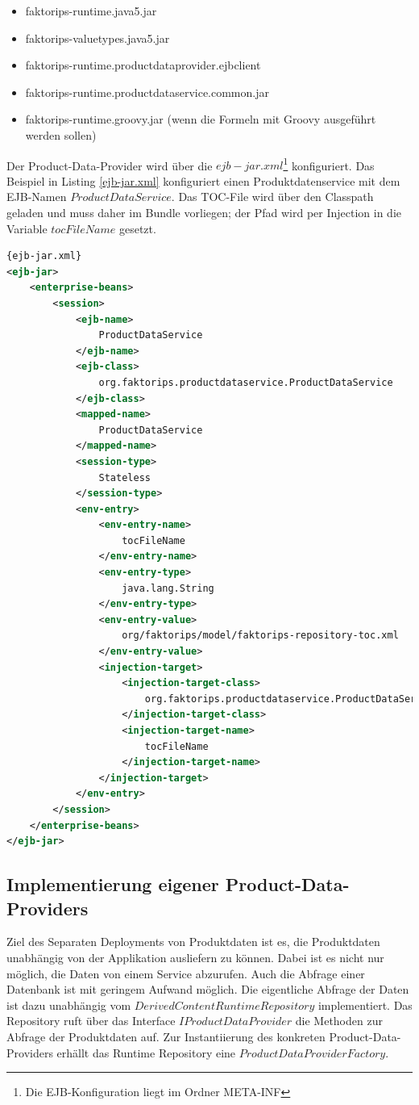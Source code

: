 \documentclass[headsepline=true, footsepline=true]{scrartcl}
\begin{document}
\begin{itemize}
	\item faktorips-runtime.java5.jar
	\item faktorips-valuetypes.java5.jar
	\item faktorips-runtime.productdataprovider.ejbclient
	\item faktorips-runtime.productdataservice.common.jar
	\item faktorips-runtime.groovy.jar (wenn die Formeln mit Groovy ausgeführt
	werden sollen)
\end{itemize}

Der Product-Data-Provider wird über die $ejb-jar.xml$\footnote{Die EJB-Konfiguration liegt im Ordner META-INF} konfiguriert. Das Beispiel in Listing \ref{ejb-jar.xml}
konfiguriert einen Produktdatenservice mit dem EJB-Namen $ProductDataService$. Das TOC-File wird über den Classpath geladen und muss daher im Bundle
vorliegen; der Pfad wird per Injection in die Variable $tocFileName$ gesetzt.

\begin{lstlisting}[caption=Beispiel einer ejb-jar.xml, label=ejb-jar.xml,language=XML]{ejb-jar.xml}
<ejb-jar>
	<enterprise-beans>
		<session>
			<ejb-name>
				ProductDataService
			</ejb-name>
			<ejb-class>
				org.faktorips.productdataservice.ProductDataService
			</ejb-class>
			<mapped-name>
				ProductDataService
			</mapped-name>
			<session-type>
				Stateless
			</session-type>
			<env-entry>
				<env-entry-name>
					tocFileName
				</env-entry-name>
				<env-entry-type>
					java.lang.String
				</env-entry-type>
				<env-entry-value>
					org/faktorips/model/faktorips-repository-toc.xml
				</env-entry-value>
				<injection-target>
					<injection-target-class>
						org.faktorips.productdataservice.ProductDataService
					</injection-target-class>
					<injection-target-name>
						tocFileName
					</injection-target-name>
				</injection-target>
			</env-entry>
		</session>
	</enterprise-beans>
</ejb-jar>
\end{lstlisting}

\subsection{Implementierung eigener Product-Data-Providers}

Ziel des Separaten Deployments von Produktdaten ist es, die Produktdaten
unabhängig von der Applikation ausliefern zu können. Dabei ist es nicht nur
möglich, die Daten von einem Service abzurufen. Auch die Abfrage einer
Datenbank ist mit geringem Aufwand möglich. Die eigentliche Abfrage der Daten
ist dazu unabhängig vom $DerivedContentRuntimeRepository$
implementiert. Das Repository ruft über das Interface $IProductDataProvider$ die
Methoden zur Abfrage der Produktdaten auf. Zur Instantiierung des konkreten
Product-Data-Providers erhällt das Runtime Repository eine
$ProductDataProviderFactory$.
\end{document}
